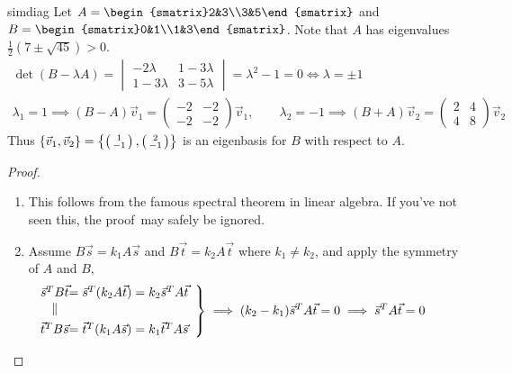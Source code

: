 
\begin{example}{}{simdiag}
Let $A=\begin{smatrix}2&3\\3&5\end{smatrix}$ and $B=\begin{smatrix}0&1\\1&3\end{smatrix}$. Note that $A$ has eigenvalues $\frac 12(7\pm\sqrt{45})>0$.
\begin{gather*}
\det(B-\lambda A)=\begin{vmatrix}
-2\lambda&1-3\lambda\\
1-3\lambda&3-5\lambda
\end{vmatrix}
=\lambda^2-1=0\iff \lambda=\pm 1\\
\lambda_1=1\implies (B-A)\vec v_1=\begin{pmatrix}-2&-2\\-2&-2\end{pmatrix}\vec v_1,\qquad
\lambda_2=-1\implies (B+A)\vec v_2=\begin{pmatrix}2&4\\4&8\end{pmatrix}\vec v_2
\end{gather*}
Thus $\{\vec v_1,\vec v_2\}=\left\{\left(\begin{smallmatrix}1\\-1\end{smallmatrix}\right),\left(\begin{smallmatrix}2\\-1\end{smallmatrix}\right)\right\}$ is an eigenbasis for $B$ with respect to $A$.
\end{example}

\begin{proof}
\begin{enumerate}
  \item This follows from the famous spectral theorem in linear algebra. If you've not seen this, the proof\footnotemark\ may safely be ignored.
	\item Assume $B\vec s=k_1A\vec s$ and $B\vec t=k_2A\vec t$ where $k_1\neq k_2$, and apply the symmetry of $A$ and $B$,
	\[\left.\begin{array}{@{}c@{}l}
		\vec s^TB\vec t &=\vec s^T(k_2A\vec t) =k_2\vec s^TA\vec t\\[1pt]
		\parallel&\\[4pt]
		\vec t^TB\vec s &=\vec t^T(k_1A\vec s) =k_1\vec t^TA\vec s
	\end{array}\right\}\implies (k_2-k_1)\vec s^TA\vec t=0 \implies \vec s^TA\vec t=0
	\tag*{\qedhere}
	\]
\end{enumerate}
\end{proof}

